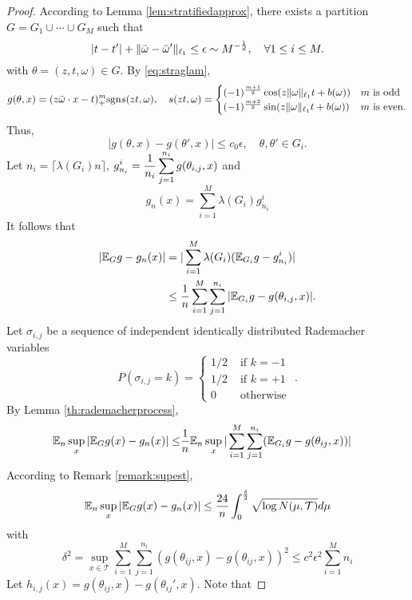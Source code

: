 \begin{proof}
According to Lemma \ref{lem:stratifiedapprox}, there exists a partition $G=G_1\cup \cdots \cup G_M$ such that
$$
|t -t'| + \|\bar\omega - \bar\omega'\|_{\ell_1}\leq \epsilon \sim M^{-{1\over d}},\quad \forall 1\le i\le M.
$$
with $\theta=(z, t, \omega)\in G$. By \eqref{eq:straglam},
$$
g(\theta, x)= (z\bar \omega\cdot x - t)_+^m {\rm sgn} s(zt,\omega),\quad s(zt,\omega)= 
\begin{cases}
(-1)^{m+1\over 2}\cos(z\|\omega\|_{\ell_1}t + b(\omega)) & m \text{ is odd}
\\
(-1)^{m+2\over 2}\sin(z\|\omega\|_{\ell_1}t + b(\omega)) & m \text{ is even}.
\end{cases}
$$
Thus,
$$
|g(\theta,x) - g(\theta',x)|\le c_0\epsilon,\quad \theta, \theta'\in G_i.
$$
Let $n_i=\lceil \lambda(G_i) n\rceil$, $\displaystyle g_{n_i}^i={1\over n_i}\sum_{j=1}^{n_i}g(\theta_{i, j}, x)$ and 
$$
g_n(x) = \sum_{i=1}^M \lambda(G_i)g_{n_i}^i
$$
It follows that
\begin{align} 
|\mathbb{E}_G g -g_n(x)| 
&= |\sum_{i=1}^M \lambda(G_i)(\mathbb{E}_{G_i} g - g_{n_i}^i)|
\\
&\le {1\over n}\sum_{i=1}^M \sum_{j=1}^{n_i}|\mathbb{E}_{G_i} g - g(\theta_{i, j},x)|.
\end{align} 
Let $\sigma_{i,j}$ be a sequence of independent identically distributed Rademacher variables
\begin{equation}
P(\sigma_{i, j}=k)=\left\{\begin{array}{cc}
1 / 2 & \text { if } k=-1 \\
1 / 2 & \text { if } k=+1 \\
0 & \text { otherwise }
\end{array}.
\right.
\end{equation}
By Lemma \ref{th:rademacherprocess},
\begin{align}  
\mathbb{E}_n\sup_x |\mathbb{E}_{G} g(x) - g_{n}(x)|\le & 
{1\over n}\mathbb{E}_n\sup_x  |\sum_{i=1}^M\sum_{j=1}^{n_i} (\mathbb{E}_{G_i} g  - g(\theta_{ij}, x))|  
\end{align} 
According to Remark \ref{remark:supest},
\begin{align}
\mathbb{E}_n\sup_x |\mathbb{E}_{G} g(x) - g_{n}(x)|
  \leq {24\over n }\int_0^{\delta\over 2} \sqrt{\log N(\mu, \mathcal{T})} d \mu
\end{align}
with 
$$
\displaystyle \delta^2= \sup_{x\in \mathcal{T}}\sum_{i=1}^M\sum_{j=1}^{n_i}(g(\theta_{ij}, x) - g(\theta_{ij}, x))^2 \le c^2\epsilon^2 \sum_{i=1}^M n_i 
$$ 
Let $h_{i, j}(x)= g(\theta_{ij}, x) - g(\theta_{ij}', x)$. Note that

\end{proof}
